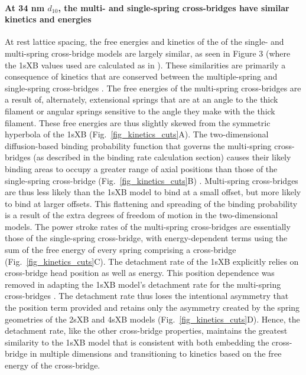 \documentclass[]{article}
\begin{document}
\paragraph{At 34 nm $d_{10}$, the multi- and single-spring cross-bridges have similar kinetics and energies} %
At rest lattice spacing, the free energies and kinetics of the of the single- and multi-spring cross-bridge models are largely similar, as seen in Figure 3 (where the 1sXB values used are calculated as in \citet[Fig.~10]{Tanner2007}).  
These similarities are primarily a consequence of kinetics that are conserved between the multiple-spring and single-spring cross-bridges \citep{Pate1989}.
The free energies of the multi-spring cross-bridges are a result of, alternately, extensional springs that are at an angle to the thick filament or angular springs sensitive to the angle they make with the thick filament. 
These free energies are thus slightly skewed from the symmetric hyperbola of the 1sXB  (Fig.~\ref{fig_kinetics_cuts}A).
The two-dimensional diffusion-based binding probability function that governs the multi-spring cross-bridges (as described in the binding rate calculation section) causes their likely binding areas to occupy a greater range of axial positions than those of the single-spring cross-bridge (Fig.~\ref{fig_kinetics_cuts}B) \citep{BergBook, DillBook}.
Multi-spring cross-bridges are thus less likely than the 1sXB model to bind at a small offset, but more likely to bind at larger offsets. 
This flattening and spreading of the binding probability is a result of the extra degrees of freedom of motion in the two-dimensional models. 
The power stroke rates of the multi-spring cross-bridges are essentially those of the single-spring cross-bridge, with energy-dependent terms using the sum of the free energy of every spring comprising a cross-bridge (Fig.~\ref{fig_kinetics_cuts}C). 
The detachment rate of the 1sXB explicitly relies on cross-bridge head position as well as energy.
This position dependence was removed in adapting the 1sXB model's detachment rate for the multi-spring cross-bridges . 
The detachment rate thus loses the intentional asymmetry that the position term provided and retains only the asymmetry created by the spring geometries of the 2sXB and 4sXB models (Fig.~\ref{fig_kinetics_cuts}D). 
Hence, the detachment rate, like the other cross-bridge properties, maintains the greatest similarity to the 1sXB model that is consistent with both embedding the cross-bridge in multiple dimensions and transitioning to kinetics based on the free energy of the cross-bridge. 
\end{document}
